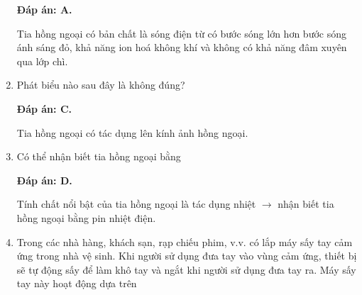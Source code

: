 \begin{enumerate}[label=\bfseries Câu \arabic*:]
{
	}
	
	\loigiai
	{		\textbf{Đáp án: A.}
		
		Tia hồng ngoại có bản chất là sóng điện từ có bước sóng lớn hơn bước sóng ánh sáng đỏ, khả năng ion hoá không khí và không có khả năng đâm xuyên qua lớp chì. 
	}
	\item {} 
	\cauhoi
	{Phát biểu nào sau đây là không đúng?
		
	}
	
	\loigiai
	{		\textbf{Đáp án: C.}
		
		Tia hồng ngoại có tác dụng lên kính ảnh hồng ngoại. 
	}
	\item {} 
	\cauhoi
	{Có thể nhận biết tia hồng ngoại bằng
	}
	
	\loigiai
	{		\textbf{Đáp án: D.}
		
		Tính chất nổi bật của tia hồng ngoại là tác dụng nhiệt $\rightarrow$ nhận biết tia hồng ngoại bằng pin nhiệt điện.
	}
	\item {} 
	\cauhoi
	{Trong các nhà hàng, khách sạn, rạp chiếu phim, v.v. có lắp máy sấy tay cảm ứng trong nhà vệ sinh. Khi người sử dụng đưa tay vào vùng cảm ứng, thiết bị sẽ tự động sấy để làm khô tay và ngắt khi người sử dụng đưa tay ra. Máy sấy tay này hoạt động dựa trên
		
		}
\end{enumerate}
